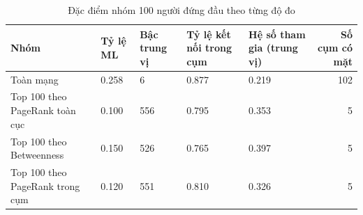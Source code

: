 \begin{table}[htbp]
\caption{Đặc điểm nhóm 100 người đứng đầu theo từng độ đo}
\label{tab:rq3_top}
\begin{tabular}{lllllr}
\toprule
Nhóm & Tỷ lệ ML & Bậc trung vị & Tỷ lệ kết nối trong cụm & Hệ số tham gia (trung vị) & Số cụm có mặt \\
\midrule
Toàn mạng & 0.258 & 6 & 0.877 & 0.219 & 102 \\
Top 100 theo PageRank toàn cục & 0.100 & 556 & 0.795 & 0.353 & 5 \\
Top 100 theo Betweenness & 0.150 & 526 & 0.765 & 0.397 & 5 \\
Top 100 theo PageRank trong cụm & 0.120 & 551 & 0.810 & 0.326 & 5 \\
\bottomrule
\end{tabular}
\end{table}
